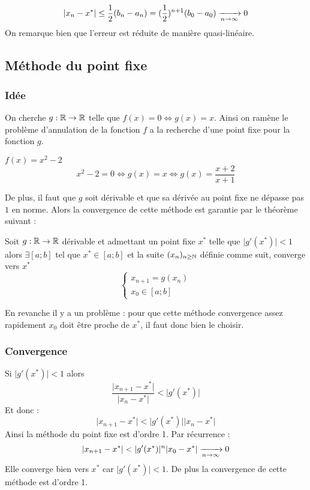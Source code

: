 			$$	\lvert x_n-x^* \rvert \leq \frac{1}{2} (b_n-a_n) = (\frac{1}{2})^{n+1} (b_0-a_0) \xrightarrow[n \to \infty]{} 0	$$
			On remarque bien que l'erreur est réduite de manière quasi-linéaire.
		

	\subsection{Méthode du point fixe}

		\subsubsection{Idée}
			On cherche $g : \mathbb{R}\to\mathbb{R}$ telle que $f(x)=0\iff g(x)=x$.
			Ainsi on ramène le problème d'annulation de la fonction $f$ a la recherche d'une point fixe pour la fonction $g$.
			\begin{exShort}
				$f(x)=x^2-2$
				$$
					x^2-2 = 0 \iff 
					g(x)=x \iff 
					g(x)=\frac{x+2}{x+1}
				$$
			\end{exShort}

			De plus, il faut que $g$ soit dérivable et que sa dérivée au point fixe ne dépasse pas $1$ en norme.
			Alors la convergence de cette méthode est garantie par le théorème suivant :

			\begin{theoreme}
				\label{th-1-gConv}
				Soit $g : \mathbb{R}\to\mathbb{R}$ dérivable et admettant un point fixe $x^*$ telle que $\lvert g'(x^*) \rvert < 1 $ alors $\exists [a;b]$ tel que $x^* \in [a;b]$ et la suite $(x_n)_{n\geq\mathbb{N}}$ définie comme suit, converge vers $x^*$
				$$
					\begin{cases}
						x_{n+1}=g(x_n) \\
						x_0 \in [a;b]
					\end{cases}
				$$
			\end{theoreme}


			En revanche il y a un problème : pour que cette méthode convergence assez rapidement $x_0$ doit être proche de $x^*$, il faut donc bien le choisir.


		\subsubsection{Convergence}
			Si $\lvert g'(x^*) \rvert < 1$ alors
			$$ \frac{\lvert x_{n+1} - x^* \rvert}{\lvert x_n - x^* \rvert} < \lvert g'(x^*) \rvert $$
			Et donc :
			$$ \lvert x_{n+1} - x^* \rvert < \lvert g'(x^*) \rvert \lvert x_n - x^* \rvert $$
			Ainsi la méthode du point fixe est d'ordre 1. Par récurrence :
			$$ \lvert x_{n+1} - x^* \rvert < \lvert g'(x^*) \rvert^n \lvert x_0 - x^* \rvert \xrightarrow[n \to \infty]{} 0$$
			Elle converge bien vers $x^*$ car $\lvert g'(x^*) \rvert < 1$.
			De plus la convergence de cette méthode est d'ordre 1.

